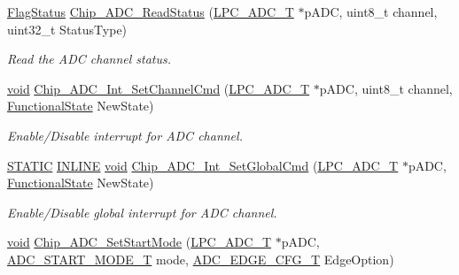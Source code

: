 \begin{DoxyCompactItemize}
\hyperlink{group__LPC__Types__Public__Types_ga89136caac2e14c55151f527ac02daaff}{Flag\-Status} \hyperlink{group__ADC__17XX__40XX_ga182ae98a23007564b3eaeb61a31ac553}{Chip\-\_\-\-A\-D\-C\-\_\-\-Read\-Status} (\hyperlink{structLPC__ADC__T}{L\-P\-C\-\_\-\-A\-D\-C\-\_\-\-T} $\ast$p\-A\-D\-C, uint8\-\_\-t channel, uint32\-\_\-t Status\-Type)
\begin{DoxyCompactList}\small\item\em Read the A\-D\-C channel status. \end{DoxyCompactList}\item 
\hyperlink{Paradigm_2Tern__EE_2small_2portmacro_8h_a14d32f8130d3c0b212cfc751730b5b49}{void} \hyperlink{group__ADC__17XX__40XX_gac0bf9a8d016bcd88866d4ae59b1ca78c}{Chip\-\_\-\-A\-D\-C\-\_\-\-Int\-\_\-\-Set\-Channel\-Cmd} (\hyperlink{structLPC__ADC__T}{L\-P\-C\-\_\-\-A\-D\-C\-\_\-\-T} $\ast$p\-A\-D\-C, uint8\-\_\-t channel, \hyperlink{group__LPC__Types__Public__Types_gac9a7e9a35d2513ec15c3b537aaa4fba1}{Functional\-State} New\-State)
\begin{DoxyCompactList}\small\item\em Enable/\-Disable interrupt for A\-D\-C channel. \end{DoxyCompactList}\item 
\hyperlink{group__LPC__Types__Public__Macros_ga10b2d890d871e1489bb02b7e70d9bdfb}{S\-T\-A\-T\-I\-C} \hyperlink{group__LPC__Types__Public__Types_ga2eb6f9e0395b47b8d5e3eeae4fe0c116}{I\-N\-L\-I\-N\-E} \hyperlink{Paradigm_2Tern__EE_2small_2portmacro_8h_a14d32f8130d3c0b212cfc751730b5b49}{void} \hyperlink{group__ADC__17XX__40XX_gafa58ed3d91229dfcc78a5fc05dd4221b}{Chip\-\_\-\-A\-D\-C\-\_\-\-Int\-\_\-\-Set\-Global\-Cmd} (\hyperlink{structLPC__ADC__T}{L\-P\-C\-\_\-\-A\-D\-C\-\_\-\-T} $\ast$p\-A\-D\-C, \hyperlink{group__LPC__Types__Public__Types_gac9a7e9a35d2513ec15c3b537aaa4fba1}{Functional\-State} New\-State)
\begin{DoxyCompactList}\small\item\em Enable/\-Disable global interrupt for A\-D\-C channel. \end{DoxyCompactList}\item 
\hyperlink{Paradigm_2Tern__EE_2small_2portmacro_8h_a14d32f8130d3c0b212cfc751730b5b49}{void} \hyperlink{group__ADC__17XX__40XX_ga951b5b680e4d3be64c83fc6e1caf644d}{Chip\-\_\-\-A\-D\-C\-\_\-\-Set\-Start\-Mode} (\hyperlink{structLPC__ADC__T}{L\-P\-C\-\_\-\-A\-D\-C\-\_\-\-T} $\ast$p\-A\-D\-C, \hyperlink{group__ADC__17XX__40XX_ga68aae5a89b4dabc910e457a00e57ea8c}{A\-D\-C\-\_\-\-S\-T\-A\-R\-T\-\_\-\-M\-O\-D\-E\-\_\-\-T} mode, \hyperlink{group__ADC__17XX__40XX_ga18d12879b004e16af3b47467a2d81d56}{A\-D\-C\-\_\-\-E\-D\-G\-E\-\_\-\-C\-F\-G\-\_\-\-T} Edge\-Option)

\end{DoxyCompactItemize}
